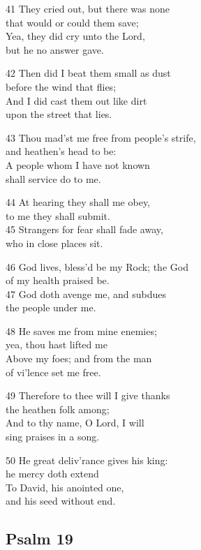 \begin{multicols}{3}
41 They cried out, but there was none\\
that would or could them save;\\
Yea, they did cry unto the Lord,\\
but he no answer gave.

42 Then did I beat them small as dust\\
before the wind that flies;\\
And I did cast them out like dirt\\
upon the street that lies.

43 Thou mad’st me free from people’s strife,\\
and heathen’s head to be:\\
A people whom I have not known\\
shall service do to me.

44 At hearing they shall me obey,\\
to me they shall submit.\\
45 Strangers for fear shall fade away,\\
who in close places sit.

46 God lives, bless’d be my Rock; the God\\
of my health praised be.\\
47 God doth avenge me, and subdues\\
the people under me.

48 He saves me from mine enemies;\\
yea, thou hast lifted me\\
Above my foes; and from the man\\
of vi’lence set me free.

49 Therefore to thee will I give thanks\\
the heathen folk among;\\
And to thy name, O Lord, I will\\
sing praises in a song.

50 He great deliv’rance gives his king:\\
he mercy doth extend\\
To David, his anointed one,\\
and his seed without end.

\begin{center}
\quad{}\quad{}
\end{center}

\subsection*{Psalm 19 }


\end{multicols}
